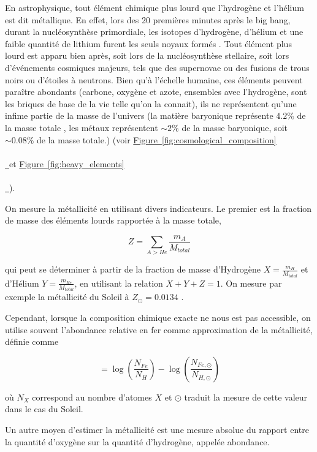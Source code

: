 \documentclass[12pt, a4paper]{article}
\newcommand*{\figref}[2][]{%
  \hyperref[{#2}]{%
    Figure~\ref*{#2}%
    \ifx\\#1\\%
    \else
      \,#1%
    \fi
  }%
}
\begin{document}
En astrophysique, tout élément chimique plus lourd que l'hydrogène et l'hélium est dit métallique. En effet, lors des 20 premières minutes après le big bang, durant la nucléosynthèse primordiale, les isotopes d'hydrogène, d'hélium et une faible quantité de lithium furent les seuls noyaux formés \parencite{2017IJMPE..2641002C}. Tout élément plus lourd est apparu bien après, soit lors de la nucléosynthèse stellaire, soit lors d'événements cosmiques majeurs, tels que des supernovae ou des fusions de trous noirs ou d'étoiles à neutrons. Bien qu'à l'échelle humaine, ces éléments peuvent paraître abondants (carbone, oxygène et azote, ensembles avec l'hydrogène, sont les briques de base de la vie telle qu'on la connait), ils ne représentent qu'une infime partie de la masse de l'univers (la matière baryonique représente $4.2 \%$ de la masse totale \parencite{2024JCAP...06..006S}, les métaux représentent $\sim 2\%$ de la masse baryonique, soit $\sim 0.08\%$ de la masse totale.) (voir \figref{fig:cosmological_composition} et \figref{fig:heavy_elements}).

On mesure la métallicité en utilisant divers indicateurs. Le premier est la fraction de masse des éléments lourds rapportée à la masse totale,

\begin{equation}
  Z = \sum_{A > He} \frac{m_A}{M_{total}}
\end{equation}

qui peut se déterminer à partir de la fraction de masse d'Hydrogène $X = \frac{m_H}{M_{total}}$ et d'Hélium $Y = \frac{m_{He}}{M_{total}}$, en utilisant la relation $X + Y + Z = 1$. On mesure par exemple la métallicité du Soleil à $Z_\odot = 0.0134$ \parencite{2009ARA&A..47..481A}.

Cependant, lorsque la composition chimique exacte ne nous est pas accessible, on utilise souvent l'abondance relative en fer comme approximation de la métallicité, définie comme 

\begin{equation}
  [Fe/H] = \log(\frac{N_{Fe}}{N_H}) - \log(\frac{N_{Fe, \odot}}{N_{H, \odot}})
\end{equation}

où $N_{X}$ correspond au nombre d'atomes $X$ et $\odot$ traduit la mesure de cette valeur dans le cas du Soleil.

Un autre moyen d'estimer la métallicité est une mesure absolue du rapport entre la quantité d'oxygène sur la quantité d'hydrogène, appelée abondance.
\end{document}
